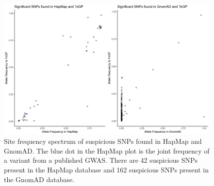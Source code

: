 \documentclass[9pt,lineno]{elife}
\begin{document}
\begin{figure}[h]
\includegraphics[width=\hsize,keepaspectratio]{./Figures/Hap_GnomAD.jpg}
\caption{Site frequency spectrum of suspicious SNPs found in HapMap and GnomAD. The blue dot in the HapMap plot is the joint frequency of a variant from a published GWAS. There are 42 suspicious SNPs present in the HapMap database and 162 suspicious SNPs present in the GnomAD database.}
\label{HapMap_GnomAD}
\end{figure}
\end{document}
